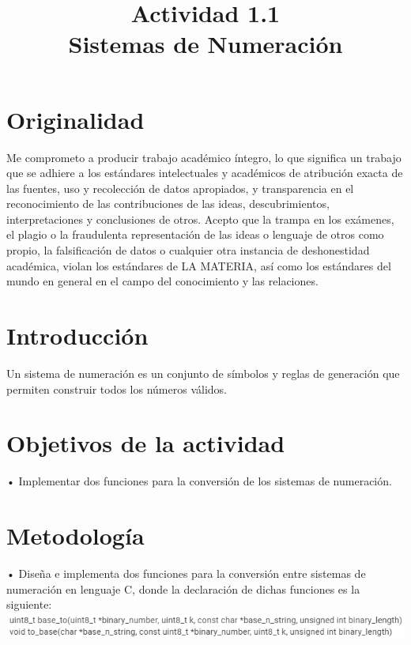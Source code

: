 \documentclass[conference]{IEEEtran}
\begin{document}
\title{Actividad 1.1 \\ Sistemas de Numeración }

\author{
 }
\onecolumn

\maketitle

\section{Originalidad}
Me comprometo a producir trabajo académico íntegro, lo que significa un trabajo que se adhiere a los estándares intelectuales y académicos de atribución exacta de las fuentes, uso y recolección de datos apropiados, y transparencia en el reconocimiento de las contribuciones de las ideas, descubrimientos, interpretaciones y conclusiones de otros.
Acepto que la trampa en los exámenes, el plagio o la fraudulenta representación de las ideas o lenguaje de otros como propio, la falsificación de datos o cualquier otra instancia de deshonestidad académica, violan los estándares de LA MATERIA, así como los estándares del mundo en general en el campo del conocimiento y las relaciones.

\section{Introducción}
\begin{center}
Un sistema de numeración es un conjunto de símbolos y reglas de generación que permiten construir todos los números válidos.
\end{center}

\section{Objetivos de la actividad}
\begin{center}
• Implementar dos funciones para la conversión de los sistemas de numeración.
\end{center}

\section{Metodología}
• Diseña e implementa dos funciones para la conversión entre sistemas de numeración en lenguaje C, donde la declaración de dichas funciones es la siguiente: \\
\includegraphics{e1} \\
\end{document}
